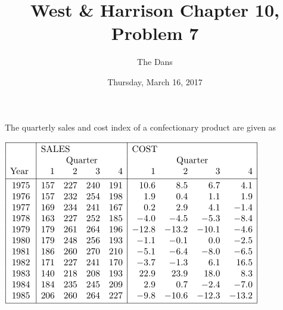 \documentclass{article}
\title{West \& Harrison Chapter 10, Problem 7}
\author{The Dans}
\date{Thursday, March 16, 2017}
\begin{document}
	\maketitle
	
	The quarterly sales and cost index of a confectionary product are given as  %

	\begin{center}
		\includegraphics[width=0.5\linewidth]{Data}
	\end{center}
\end{document}

